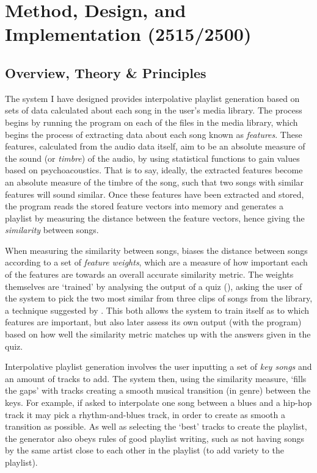 \chapter{Method, Design, and Implementation (2515/2500)}
\section{Overview, Theory \& Principles}
The system I have designed provides interpolative playlist generation based on sets of data calculated about each song in the user's media library. The process begins by running the  program on each of the files in the media library, which begins the process of extracting data about each song known as \emph{features}. These features, calculated from the audio data itself, aim to be an absolute measure of the sound (or \emph{timbre}) of the audio, by using statistical functions to gain values based on psychoacoustics. That is to say, ideally, the extracted features become an absolute measure of the timbre of the song, such that two songs with similar features will sound similar. Once these features have been extracted and stored, the  program reads the stored feature vectors into memory and generates a playlist by measuring the distance between the feature vectors, hence giving the \emph{similarity} between songs.

When measuring the similarity between songs,  biases the distance between songs according to a set of \emph{feature weights}, which are a measure of how important each of the features are towards an overall accurate similarity metric. The weights themselves are `trained' by analysing the output of a quiz (), asking the user of the system to pick the two most similar from three clips of songs from the library, a technique suggested by \citet*{Novello2006}. This both allows the system to train itself as to which features are important, but also later assess its own output (with the  program) based on how well the similarity metric matches up with the answers given in the quiz.

Interpolative playlist generation involves the user inputting a set of \emph{key songs} and an amount of tracks to add. The system then, using the similarity measure, `fills the gaps' with tracks creating a smooth musical transition (in genre) between the keys. For example, if asked to interpolate one song between a blues and a hip-hop track it may pick a rhythm-and-blues track, in order to create as smooth a transition as possible. As well as selecting the `best' tracks to create the playlist, the generator also obeys rules of good playlist writing, such as not having songs by the same artist close to each other in the playlist (to add variety to the playlist).

